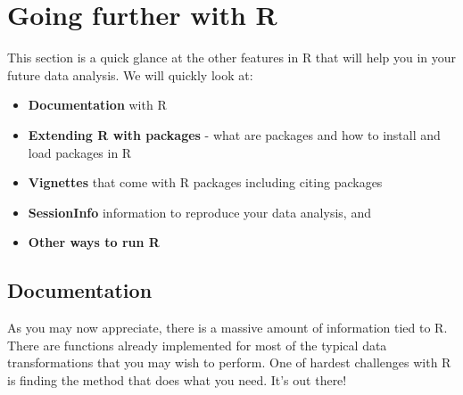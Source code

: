 \documentclass[a4paper]{book}
\providecommand{\tightlist}{%
  \setlength{\itemsep}{0pt}\setlength{\parskip}{0pt}}
\begin{document}
\chapter{Going further with R}\label{going-further-with-r}

This section is a quick glance at the other features in R that will help
you in your future data analysis. We will quickly look at:

\begin{itemize}
\tightlist
\item
  \textbf{Documentation} with R
\item
  \textbf{Extending R with packages} - what are packages and how to
  install and load packages in R
\item
  \textbf{Vignettes} that come with R packages including citing packages
\item
  \textbf{SessionInfo} information to reproduce your data analysis, and
\item
  \textbf{Other ways to run R}
\end{itemize}

\section{Documentation}\label{documentation}

As you may now appreciate, there is a massive amount of information tied
to R. There are functions already implemented for most of the typical
data transformations that you may wish to perform. One of hardest
challenges with R is finding the method that does what you need. It's
out there!
\end{document}
